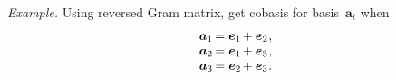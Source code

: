 \begin{otherlanguage}{russian}
\begin{tcolorbox}
\emph{Example.} Using reversed Gram matrix, get cobasis for basis~$\bm{a}_i$ when
\[ \begin{array}{l}
\bm{a}_1 \hspace{-0.2ex} = \bm{e}_1 \hspace{-0.2ex} + \bm{e}_2 \hspace{.1ex} , \\
\bm{a}_2 \hspace{-0.2ex} = \bm{e}_1 \hspace{-0.2ex} + \bm{e}_3 \hspace{.1ex} , \\
\bm{a}_3 \hspace{-0.2ex} = \bm{e}_2 \hspace{-0.2ex} + \bm{e}_3 \hspace{.1ex} .
\end{array} \]


\end{tcolorbox}
\end{otherlanguage}
